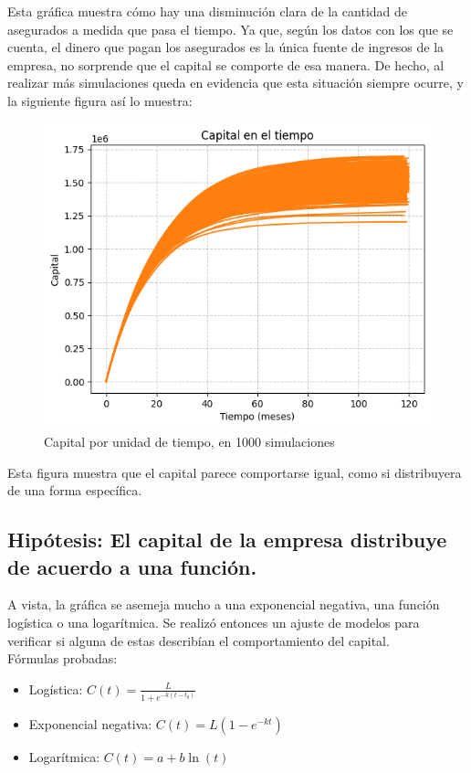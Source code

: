 \documentclass[spanish]{article}
\begin{document}
Esta gr\'afica muestra c\'omo hay una disminuci\'on clara de la cantidad de asegurados a medida que pasa el tiempo.
Ya que, seg\'un los datos con los que se cuenta, el dinero que pagan los asegurados es la \'unica fuente de ingresos de la empresa, no sorprende que el capital se comporte de esa manera.
De hecho, al realizar m\'as simulaciones queda en evidencia que esta situaci\'on siempre ocurre, y la siguiente figura as\'i lo muestra:
\begin{figure}[H]
    \centering
    \includegraphics[scale=0.5]{capital_tiempo_mil_sim.png}
    \caption{Capital por unidad de tiempo, en 1000 simulaciones}
    \label{fig:Capital por unidad de tiempo, en 1000 simulaciones}
\end{figure}
Esta figura muestra que el capital parece comportarse igual, como si distribuyera de una forma espec\'ifica.

\subsection{Hip\'otesis: El capital de la empresa distribuye de acuerdo a una funci\'on.}

A vista, la gr\'afica se asemeja mucho a una exponencial negativa, una funci\'on log\'istica o una logar\'itmica.
Se realiz\'o entonces un ajuste de modelos para verificar si alguna de estas describ\'ian el comportamiento del capital.\\
F\'ormulas probadas:\\
\begin{itemize}
    \item Log\'istica: $C(t) = \frac{L}{1 + e^{-k\left(t - t_0\right)}}$
    \item Exponencial negativa: $C(t) = L(1 - e^{-kt})$
    \item Logar\'itmica: $C(t) = a + b\ln(t)$
\end{itemize}
\end{document}
